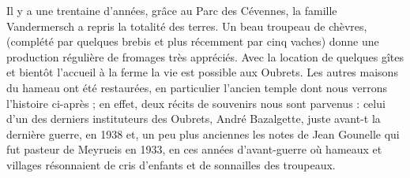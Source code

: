 Il y a une trentaine d’années, grâce au Parc des Cévennes, la famille Vandermersch a repris la
totalité des terres. Un beau troupeau de chèvres, (complété par quelques brebis et plus
récemment par cinq vaches) donne une production régulière de fromages très appréciés.
Avec la location de quelques gîtes et bientôt l’accueil à la ferme la vie est possible aux
Oubrets. Les autres maisons du hameau ont été restaurées, en particulier l’ancien temple dont
nous verrons l’histoire ci-après ; en effet, deux récits de souvenirs nous sont parvenus : celui
d’un des derniers instituteurs des Oubrets, André Bazalgette, juste avant-t la dernière guerre,
en 1938 et, un peu plus anciennes les notes de Jean Gounelle qui fut pasteur de Meyrueis en
1933, en ces années d’avant-guerre où hameaux et villages résonnaient de cris d’enfants et de
sonnailles des troupeaux.
